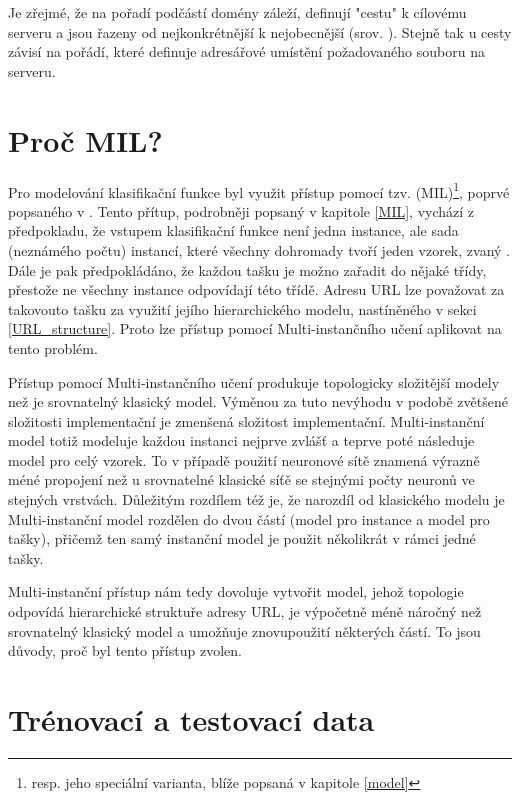 Je zřejmé, že na pořadí podčástí domény záleží, definují "cestu" k cílovému serveru a jsou řazeny od nejkonkrétnější k nejobecnější (srov. \cite{mockapetris_domain_1987}).	Stejně tak u cesty závisí na pořádí, které definuje adresářové umístění požadovaného souboru na serveru.

\section{Proč MIL?}

Pro modelování klasifikační funkce byl využit přístup pomocí tzv.  (MIL)\footnote{resp. jeho speciální varianta, blíže popsaná v kapitole \ref{model}}, poprvé popsaného v \cite{dietterich_solving_1997}. Tento přítup, podrobněji popsaný v kapitole \ref{MIL}, vychází z předpokladu, že vstupem klasifikační funkce není jedna instance, ale sada (neznámého počtu) instancí, které všechny dohromady tvoří jeden vzorek, zvaný . Dále je pak předpokládáno, že každou tašku je možno zařadit do nějaké třídy, přestože ne všechny instance odpovídají této třídě. Adresu URL lze považovat za takovouto tašku za využití jejího hierarchického modelu, nastíněného v sekci \ref{URL_structure}. Proto lze přístup pomocí Multi-instančního učení aplikovat na tento problém.

Přístup pomocí Multi-instančního učení produkuje topologicky složitější modely než je srovnatelný klasický model. Výměnou za tuto nevýhodu v podobě zvětšené složitosti implementační je zmenšená složitost implementační. Multi-instanční model totiž modeluje každou instanci nejprve zvlášť a teprve poté následuje model pro celý vzorek. To v případě použití neuronové sítě znamená výrazně méné propojení než u srovnatelné klasické síťě se stejnými počty neuronů ve stejných vrstvách. Důležitým rozdílem též je, že narozdíl od klasického modelu je Multi-instanční model rozdělen do dvou částí (model pro instance a model pro tašky), přičemž ten samý instanční model je použit několikrát v rámci jedné tašky.

Multi-instanční přístup nám tedy dovoluje vytvořit model, jehož topologie odpovídá hierarchické struktuře adresy URL, je výpočetně méně náročný než srovnatelný klasický model a umožňuje znovupoužití některých částí. To jsou důvody, proč byl tento přístup zvolen.

\section{Trénovací a testovací data}

